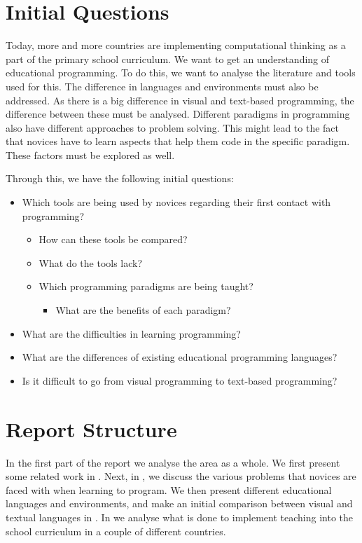 \section{Initial Questions}
Today, more and more countries are implementing computational thinking as a part of the primary school curriculum. We want to get an understanding of educational programming. To do this, we want to analyse the literature and tools used for this. The difference in languages and environments must also be addressed. As there is a big difference in visual and text-based programming, the difference between these must be analysed. Different paradigms in programming also have different approaches to problem solving. This might lead to the fact that novices have to learn aspects that help them code in the specific paradigm. These factors must be explored as well.

Through this, we have the following initial questions:

\begin{itemize}
  \item Which tools are being used by novices regarding their first contact with programming?
  \begin{itemize}
    \item How can these tools be compared?
    \item What do the tools lack?
    \item Which programming paradigms are being taught?
    \begin{itemize}
      \item What are the benefits of each paradigm?
    \end{itemize}
  \end{itemize}
  \item What are the difficulties in learning programming?

  \item What are the differences of existing educational programming languages?
  \item Is it difficult to go from visual programming to text-based programming?
\end{itemize}

\section{Report Structure}
In the first part of the report we analyse the area as a whole. We first present some related work in . Next, in , we discuss the various problems that novices are faced with when learning to program. We then present different educational languages and environments, and make an initial comparison between visual and textual languages in . In  we analyse what is done to implement teaching into the school curriculum in a couple of different countries.

